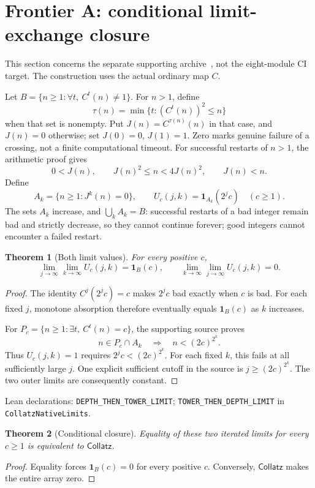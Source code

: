 \documentclass[11pt,a4paper]{article}
\newtheorem{theorem}{Theorem}[section]
\theoremstyle{definition}
\newcommand{\CC}{\mathsf{Collatz}}
\newcommand{\one}{\mathbf 1}
\newcommand{\name}[1]{{\small\texttt{#1}}}
\newcommand{\source}[1]{\par{\footnotesize\color{ink}Lean declarations: #1.}\par}
\begin{document}
\newpage
\section{Frontier A: conditional limit-exchange closure}
This section concerns the separate supporting archive~\cite{frontier}, not the
eight-module CI target. The construction uses the actual ordinary map $C$.

Let $B=\{n\ge1:\forall t,\ C^t(n)\ne1\}$. For $n>1$, define
\[
 \tau(n)=\min\{t:(C^t(n))^2\le n\}
\]
when that set is nonempty. Put $J(n)=C^{\tau(n)}(n)$ in that case, and
$J(n)=0$ otherwise; set $J(0)=0$, $J(1)=1$.
Zero marks genuine failure of a crossing, not a finite computational timeout.
For successful restarts of $n>1$, the arithmetic proof gives
\[
 0<J(n),\qquad J(n)^2\le n<4J(n)^2,\qquad J(n)<n.
\]
Define
\[
 A_k=\{n\ge1:J^k(n)=0\},
 \qquad U_c(j,k)=\one_{A_k}(2^jc)\quad(c\ge1).
\]
The sets $A_k$ increase, and $\bigcup_k A_k=B$: successful restarts of a bad
integer remain bad and strictly decrease, so they cannot continue forever;
good integers cannot encounter a failed restart.

\begin{theorem}[Both limit values]
For every positive $c$,
\[
 \lim_{j\to\infty}\lim_{k\to\infty}U_c(j,k)=\one_B(c),
 \qquad
 \lim_{k\to\infty}\lim_{j\to\infty}U_c(j,k)=0.
\]
\end{theorem}
\begin{proof}
The identity $C^j(2^jc)=c$ makes $2^jc$ bad exactly when $c$ is bad.
For each fixed $j$, monotone absorption therefore eventually equals
$\one_B(c)$ as $k$ increases.

For $P_c=\{n\ge1:\exists t,\ C^t(n)=c\}$, the supporting source proves
\[
 n\in P_c\cap A_k\quad\Longrightarrow\quad n<(2c)^{2^k}.
\]
Thus $U_c(j,k)=1$ requires $2^jc<(2c)^{2^k}$. For each fixed $k$, this
fails at all sufficiently large $j$. One explicit sufficient cutoff in the
source is $j\ge(2c)^{2^k}$. The two outer limits are consequently constant.
\end{proof}
\source{\name{DEPTH\_THEN\_TOWER\_LIMIT};
\name{TOWER\_THEN\_DEPTH\_LIMIT} in \name{CollatzNativeLimits}}

\begin{theorem}[Conditional closure]
Equality of these two iterated limits for every $c\ge1$ is equivalent to $\CC$.
\end{theorem}
\begin{proof}
Equality forces $\one_B(c)=0$ for every positive $c$. Conversely, $\CC$ makes
the entire array zero.
\end{proof}
\end{document}
